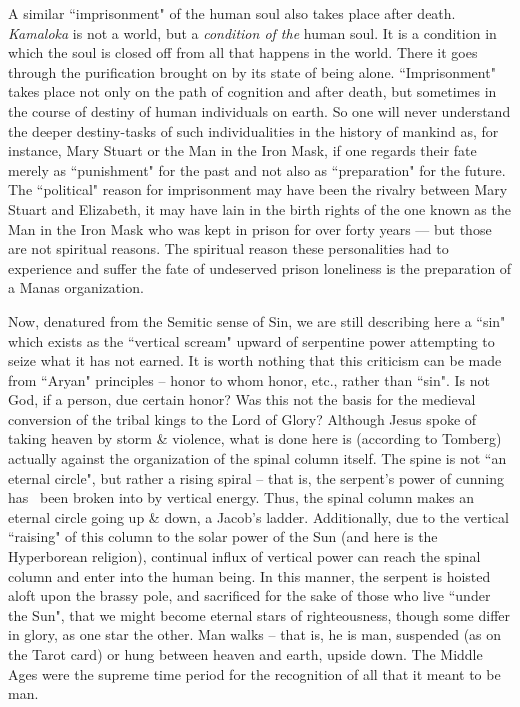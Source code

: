 \begin{quotationx}
A similar ``imprisonment" of the human soul also takes place after death. \emph{Kamaloka} is not a world, but a \emph{condition of the} human soul. It is a condition in which the soul is closed off from all that happens in the world. There it goes through the purification brought on by its state of being alone. ``Imprisonment" takes place not only on the path of cognition and after death, but sometimes in the course of destiny of human individuals on earth. So one will never understand the deeper destiny-tasks of such individualities in the history of mankind as, for instance, Mary Stuart or the Man in the Iron Mask, if one regards their fate merely as ``punishment" for the past and not also as ``preparation" for the future. The ``political" reason for imprisonment may have been the rivalry between Mary Stuart and Elizabeth, it may have lain in the birth rights of the one known as the Man in the Iron Mask who was kept in prison for over forty years — but those are not spiritual reasons. The spiritual reason these personalities had to experience and suffer the fate of undeserved prison loneliness is the preparation of a Manas organization.

\end{quotationx}
Now, denatured from the Semitic sense of Sin, we are still describing here a ``sin" which exists as the ``vertical scream" upward of serpentine power attempting to seize what it has not earned. It is worth nothing that this criticism can be made from ``Aryan" principles – honor to whom honor, etc., rather than ``sin". Is not God, if a person, due certain honor? Was this not the basis for the medieval conversion of the tribal kings to the Lord of Glory? Although Jesus spoke of taking heaven by storm \& violence, what is done here is (according to Tomberg) actually against the organization of the spinal column itself. The spine is not ``an eternal circle", but rather a rising spiral – that is, the serpent's power of cunning has  been broken into by vertical energy. Thus, the spinal column makes an eternal circle going up \& down, a Jacob's ladder. Additionally, due to the vertical ``raising" of this column to the solar power of the Sun (and here is the Hyperborean religion), continual influx of vertical power can reach the spinal column and enter into the human being. In this manner, the serpent is hoisted aloft upon the brassy pole, and sacrificed for the sake of those who live ``under the Sun", that we might become eternal stars of righteousness, though some differ in glory, as one star the other. Man walks – that is, he is man, suspended (as on the Tarot card) or hung between heaven and earth, upside down. The Middle Ages were the supreme time period for the recognition of all that it meant to be man.

